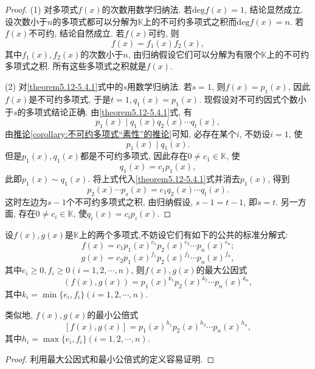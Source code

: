 \documentclass[../../main.tex]{subfiles}%
\begin{document}
\begin{proof}

(1) 对多项式\(f(x)\)的次数用数学归纳法. 若\(\mathrm{deg }f(x)=1\), 结论显然成立. 设次数小于\(n\)的多项式都可以分解为\(\mathbb{K}\)上的不可约多项式之积而\(\mathrm{deg }f(x)=n\). 若\(f(x)\)不可约, 结论自然成立. 若\(f(x)\)可约, 则
\[
f(x)=f_1(x)f_2(x),
\]
其中\(f_1(x),f_2(x)\)的次数小于\(n\), 由归纳假设它们可以分解为有限个\(\mathbb{K}\)上的不可约多项式之积. 所有这些多项式之积就是\(f(x)\).

(2) 对\eqref{theorem5.12-5.4.1}式中的\(s\)用数学归纳法. 若\(s = 1\), 则\(f(x)=p_1(x)\), 因此\(f(x)\)是不可约多项式, 于是\(t = 1, q_1(x)=p_1(x)\). 现假设对不可约因式个数小于\(s\)的多项式结论正确. 由\eqref{theorem5.12-5.4.1}式, 有
\[
p_1(x)\mid q_1(x)q_2(x)\cdots q_t(x),
\]
由\hyperref[corollary:不可约多项式“素性”的推论]{推论\ref{corollary:不可约多项式“素性”的推论}}可知, 必存在某个\(i\), 不妨设\(i = 1\), 使
\[
p_1(x)\mid q_1(x).
\]
但是\(p_1(x),q_1(x)\)都是不可约多项式, 因此存在\(0\neq c_1\in\mathbb{K}\), 使
\[
q_1(x)=c_1p_1(x),
\]
此即\(p_1(x)\sim q_1(x)\). 将上式代入\eqref{theorem5.12-5.4.1}式并消去\(p_1(x)\), 得到
\[
p_2(x)\cdots p_s(x)=c_1q_2(x)\cdots q_t(x).
\]
这时左边为\(s - 1\)个不可约多项式之积, 由归纳假设, \(s - 1=t - 1\), 即\(s = t\). 另一方面, 存在\(0\neq c_i\in\mathbb{K}\), 使\(q_i(x)=c_ip_i(x)\).

\end{proof}

\begin{corollary}\label{corollary:标准分解式具有相同因子的多项式的最大公因式与最小公倍式}
设\(f(x),g(x)\)是\(\mathbb{K}\)上的两个多项式,不妨设它们有如下的公共的标准分解式:
\[
f(x)=c_1p_1(x)^{e_1}p_2(x)^{e_2}\cdots p_n(x)^{e_n};
\]
\[
g(x)=c_2p_1(x)^{f_1}p_2(x)^{f_2}\cdots p_n(x)^{f_n},
\]
其中\(e_i\geqslant  0, f_i\geqslant  0(i = 1,2,\cdots,n)\), 则\(f(x),g(x)\)的最大公因式
\[
(f(x),g(x))=p_1(x)^{k_1}p_2(x)^{k_2}\cdots p_n(x)^{k_n},
\]
其中\(k_i = \min\{e_i,f_i\}(i = 1,2,\cdots,n)\).

类似地, \(f(x),g(x)\)的最小公倍式
\[
[f(x),g(x)]=p_1(x)^{h_1}p_2(x)^{h_2}\cdots p_n(x)^{h_n},
\]
其中\(h_i = \max\{e_i,f_i\}(i = 1,2,\cdots,n)\).
\end{corollary}
\begin{proof}

利用最大公因式和最小公倍式的定义容易证明.

\end{proof}
\end{document}
